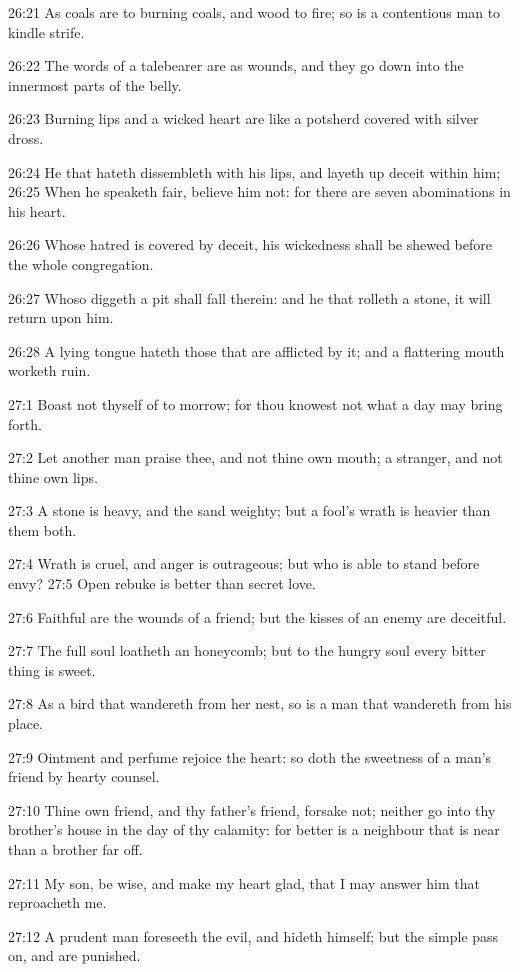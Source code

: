 26:21 As coals are to burning coals, and wood to fire; so is a
contentious man to kindle strife.

26:22 The words of a talebearer are as wounds, and they go down into
the innermost parts of the belly.

26:23 Burning lips and a wicked heart are like a potsherd covered with
silver dross.

26:24 He that hateth dissembleth with his lips, and layeth up deceit
within him; 26:25 When he speaketh fair, believe him not: for there
are seven abominations in his heart.

26:26 Whose hatred is covered by deceit, his wickedness shall be
shewed before the whole congregation.

26:27 Whoso diggeth a pit shall fall therein: and he that rolleth a
stone, it will return upon him.

26:28 A lying tongue hateth those that are afflicted by it; and a
flattering mouth worketh ruin.

27:1 Boast not thyself of to morrow; for thou knowest not what a day
may bring forth.

27:2 Let another man praise thee, and not thine own mouth; a stranger,
and not thine own lips.

27:3 A stone is heavy, and the sand weighty; but a fool's wrath is
heavier than them both.

27:4 Wrath is cruel, and anger is outrageous; but who is able to stand
before envy?  27:5 Open rebuke is better than secret love.

27:6 Faithful are the wounds of a friend; but the kisses of an enemy
are deceitful.

27:7 The full soul loatheth an honeycomb; but to the hungry soul every
bitter thing is sweet.

27:8 As a bird that wandereth from her nest, so is a man that
wandereth from his place.

27:9 Ointment and perfume rejoice the heart: so doth the sweetness of
a man's friend by hearty counsel.

27:10 Thine own friend, and thy father's friend, forsake not; neither
go into thy brother's house in the day of thy calamity: for better is
a neighbour that is near than a brother far off.

27:11 My son, be wise, and make my heart glad, that I may answer him
that reproacheth me.

27:12 A prudent man foreseeth the evil, and hideth himself; but the
simple pass on, and are punished.

